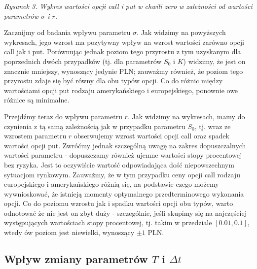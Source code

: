 \documentclass[
]{article}
\begin{document}
\emph{Rysunek 3. Wykres wartości opcji call i put w chwili zero w
zależności od wartości parametrów \(\sigma\) i \(r\).}

Zacznijmy od badania wpływu parametru \(\sigma\). Jak widzimy na
powyższych wykresach, jego wzrost ma pozytywny wpływ na wzrost wartości
zarówno opcji call jak i put. Porównując jednak poziom tego przyrostu z
tym uzyskanym dla poprzednich dwóch przypadków (tj. dla parametrów
\(S_0\) i \(K\)) widzimy, że jest on znacznie mniejszy, wynoszący
jedynie PLN; zauważmy również, że poziom tego przyrostu zdaje się być
równy dla obu typów opcji. Co do różnic między wartościami opcji put
rodzaju amerykańskiego i europejskiego, ponownie owe różnice są
minimalne.

Przejdźmy teraz do wpływu parametru \(r\). Jak widzimy na wykresach,
mamy do czynienia z tą samą zależnością jak w przypadku parametru
\(S_0\), tj. wraz ze wzrostem parametru \(r\) obserwujemy wzrost
wartości opcji call oraz spadek wartości opcji put. Zwróćmy jednak
szczególną uwagę na zakres dopuszczalnych wartości parametru -
dopuszczamy również ujemne wartości stopy procentowej bez ryzyka. Jest
to oczywiście wartość odpowiadająca dość niepowszechnym sytuacjom
rynkowym. Zauważmy, że w tym przypadku ceny opcji call rodzaju
europejskiego i amerykańskiego różnią się, na podstawie czego możemy
wywnioskować, że istnieją momenty optymalnego przedterminowego wykonania
opcji. Co do poziomu wzrostu jak i spadku wartości opcji obu typów,
warto odnotować że nie jest on zbyt duży - szczególnie, jeśli skupimy
się na najczęściej występujących wartościach stopy procentowej, tj.
takim w przedziale \([0.01, 0.1]\), wtedy ów poziom jest niewielki,
wynoszący \(\pm 1\) PLN.

\hypertarget{wpux142yw-zmiany-parametruxf3w-t-i-delta-t}{%
\subsection{\texorpdfstring{Wpływ zmiany parametrów \(T\) i
\(\Delta t\)}{Wpływ zmiany parametrów T i \textbackslash Delta t}}\label{wpux142yw-zmiany-parametruxf3w-t-i-delta-t}}
\end{document}
